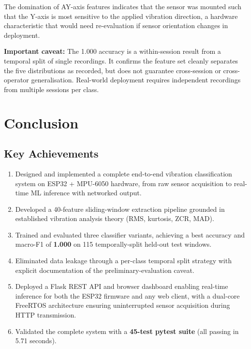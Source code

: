 \documentclass[12pt,a4paper]{report}
\begin{document}
The domination of AY-axis features indicates that the sensor was mounted such
that the Y-axis is most sensitive to the applied vibration direction, a
hardware characteristic that would need re-evaluation if sensor orientation
changes in deployment.

\textbf{Important caveat:} The 1.000 accuracy is a within-session result
from a temporal split of single recordings. It confirms the feature set
cleanly separates the five distributions as recorded, but does not guarantee
cross-session or cross-operator generalisation. Real-world deployment requires
independent recordings from multiple sessions per class.

\chapter{Conclusion}

\section{Key Achievements}

\begin{enumerate}
  \item Designed and implemented a complete end-to-end vibration classification
        system on ESP32 + MPU-6050 hardware, from raw sensor acquisition to
        real-time ML inference with networked output.
  \item Developed a 40-feature sliding-window extraction pipeline grounded in
        established vibration analysis theory (RMS, kurtosis, ZCR, MAD).
  \item Trained and evaluated three classifier variants, achieving a best
        accuracy and macro-F1 of \textbf{1.000} on 115 temporally-split
        held-out test windows.
  \item Eliminated data leakage through a per-class temporal split strategy
        with explicit documentation of the preliminary-evaluation caveat.
  \item Deployed a Flask REST API and browser dashboard enabling real-time
        inference for both the ESP32 firmware and any web client, with a
        dual-core FreeRTOS architecture ensuring uninterrupted sensor
        acquisition during HTTP transmission.
  \item Validated the complete system with a \textbf{45-test pytest suite}
        (all passing in 5.71 seconds).
\end{enumerate}
\end{document}
